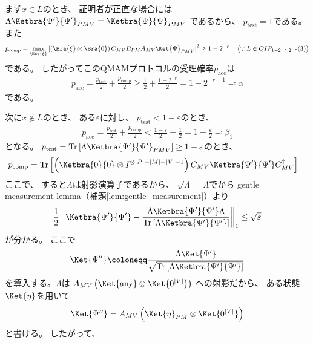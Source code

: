 \documentclass[a4paper, 10pt]{jsarticle}
\DeclareMathOperator{\Tr}{Tr}
\begin{document}
まず$x \in L$のとき、
証明者が正直な場合には
$\Lambda \Ketbra{\Psi'}{\Psi'}_{PMV} = \Ketbra{\Psi}{\Psi}_{PMV}$
であるから、
$p_\mathrm{test} = 1$である。
また
\begin{align}
	p_\mathrm{comp}
	= \max_{\Ket{\xi}} \left|
		\left( \Bra{\xi} \otimes \Bra{0} \right)
		C_{MV} B_{PM} A_{MV} \Ket{\Psi}_{PMV}
	\right|^2
	\geq 1 - 2^{-r} \quad
	\left( \because L \in QIP_{1 - 2^{-r}, 2^{-r}}(3) \right)
\end{align}
である。
したがってこのQMAMプロトコルの受理確率$p_\mathrm{acc}$は
\begin{align}
	p_\mathrm{acc} 
	= \frac{p_\mathrm{test}}{2} + \frac{p_\mathrm{comp}}{2}
	\geq \frac{1}{2} + \frac{1 - 2^{-r}}{2}
	= 1 - 2^{-r - 1}
	\eqqcolon \alpha
\end{align}
である。

次に$x \notin L$のとき、
ある$\varepsilon$に対し、
$p_\mathrm{test} < 1 - \varepsilon$のとき、
\begin{align}
	p_\mathrm{acc}
	= \frac{p_\mathrm{test}}{2} + \frac{p_\mathrm{comp}}{2}
	< \frac{1 - \varepsilon}{2} + \frac{1}{2}
	= 1 - \frac{\varepsilon}{2}
	\eqqcolon \beta_1
\end{align}
となる。
$p_\mathrm{test}
= \Tr \left[ \Lambda \Ketbra{\Psi'}{\Psi'}_{PMV} \right]
\geq 1 - \varepsilon$のとき、
\begin{align}
	p_{\mathrm{comp}}
	&= \Tr \left[
		\left( \Ketbra{0}{0} \otimes I^{\otimes |P|+|M|+|V|-1} \right)
		C_{MV} \Ketbra{\Psi'}{\Psi'} C_{MV}^\dagger
	\right]
\end{align}
ここで、
すると$\Lambda$は射影演算子であるから、
$\sqrt{\Lambda} = \Lambda$でから
gentle measurement lemma（補題\ref{lem:gentle_measurement}）より
\begin{align}
	\frac{1}{2} \left\|
		\Ketbra{\Psi'}{\Psi'}
		- \frac{\Lambda \Ketbra{\Psi'}{\Psi'} \Lambda}
		{\Tr \left[ \Lambda \Ketbra{\Psi'}{\Psi'} \right]}
	\right\|_1
	\leq \sqrt{\varepsilon}
\end{align}
が分かる。
ここで
\begin{align}
	\Ket{\Psi''} \coloneqq
	\frac{\Lambda \Ket{\Psi'}}
	{\sqrt{\Tr \left[ \Lambda \Ketbra{\Psi'}{\Psi'} \right]}}
\end{align}
を導入する。$\Lambda$は
$A_{MV} \left( \Ket{\mathrm{any}} \otimes \Ket{0^{|V|}}\right)$
への射影だから、
ある状態$\Ket{\eta}$を用いて
\begin{align}
	\Ket{\Psi''}
	= A_{MV} \left( \Ket{\eta}_{PM} \otimes \Ket{0^{|V|}} \right)
\end{align}
と書ける。
したがって、
\end{document}
